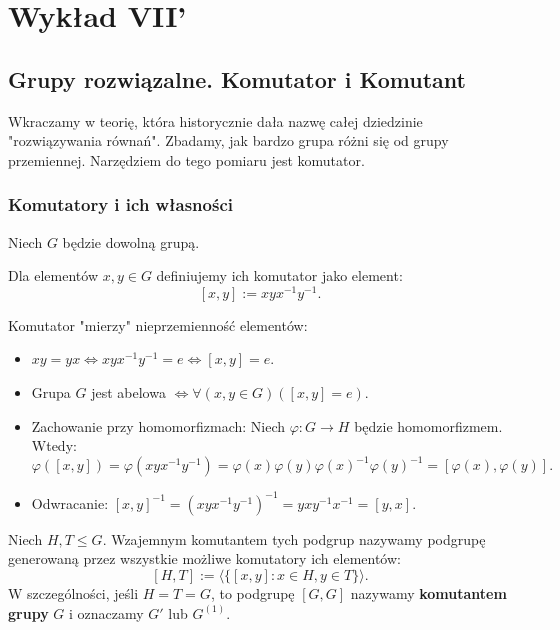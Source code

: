 \chapter{Wykład VII'}

\section{Grupy rozwiązalne. Komutator i Komutant} 

\begin{context}
	Wkraczamy w teorię, która historycznie dała nazwę całej dziedzinie "rozwiązywania równań". Zbadamy, jak bardzo grupa różni się od grupy przemiennej. Narzędziem do tego pomiaru jest komutator.
\end{context}

\subsection{Komutatory i ich własności}

Niech $G$ będzie dowolną grupą.

\begin{definition}[Komutator]
	Dla elementów $x,y \in G$ definiujemy ich komutator jako element:
	\[
		\left[ x,y \right] := xyx^{-1}y^{-1}.
	\] 
\end{definition} 

\begin{remark}
	Komutator "mierzy" nieprzemienność elementów:
	\begin{itemize}
		\item $xy=yx \iff xyx^{-1}y^{-1} = e \iff \left[ x,y \right] = e$.
		\item Grupa $G$ jest abelowa $\iff \forall\left( x,y \in G \right) \left( \left[ x,y \right] = e \right)$.
		\item Zachowanie przy homomorfizmach: Niech $\varphi : G \to H$ będzie homomorfizmem. Wtedy:
		\[ \varphi \left( \left[ x,y \right] \right) = \varphi(xyx^{-1}y^{-1}) = \varphi(x)\varphi(y)\varphi(x)^{-1}\varphi(y)^{-1} = \left[ \varphi (x), \varphi \left( y \right) \right]. \]
		\item Odwracanie: $[x,y]^{-1} = (xyx^{-1}y^{-1})^{-1} = yxy^{-1}x^{-1} = [y,x]$.
	\end{itemize}
\end{remark}

\begin{definition}
	Niech $H, T \le G$. Wzajemnym komutantem tych podgrup nazywamy podgrupę generowaną przez wszystkie możliwe komutatory ich elementów:
	\[ \left[ H,T \right] := \langle \{\left[ x,y \right]: x\in H, y\in T \}  \rangle. \]
	W szczególności, jeśli $H=T=G$, to podgrupę $[G,G]$ nazywamy \textbf{komutantem grupy} $G$ i oznaczamy $G'$ lub $G^{(1)}$.
\end{definition} 

